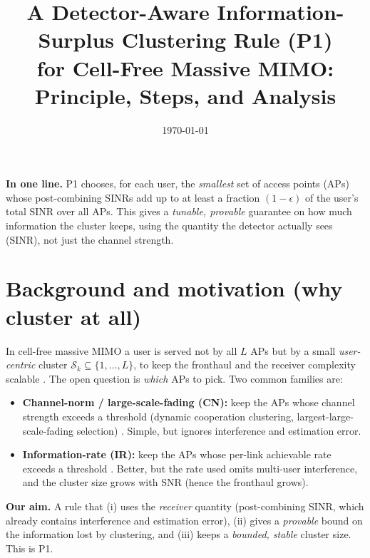 \documentclass[11pt]{article}
\title{\textbf{A Detector-Aware Information-Surplus Clustering Rule (P1)\\for Cell-Free Massive MIMO: Principle, Steps, and Analysis}}
\date{\today}
\newcommand{\Sk}{\mathcal{S}_k}\newcommand{\E}{\mathbb{E}}
\begin{document}
\maketitle
\newcommand{\vexp}[2]{\par\smallskip\noindent\textit{#2}}

\begin{keybox}
\textbf{In one line.} P1 chooses, for each user, the \emph{smallest} set of access points (APs)
whose post-combining SINRs add up to at least a fraction $(1-\epsilon)$ of the user's total SINR
over all APs. This gives a \emph{tunable, provable} guarantee on how much information the cluster
keeps, using the quantity the detector actually sees (SINR), not just the channel strength.
\end{keybox}

\section{Background and motivation (why cluster at all)}
In cell-free massive MIMO a user is served not by all $L$ APs but by a small \emph{user-centric}
cluster $\Sk\subseteq\{1,\dots,L\}$, to keep the fronthaul and the receiver complexity scalable
\cite{ngo2017cellfree,buzzi2017usercentric,interdonato2019ubiquitous,bjornson2020scalable}. The open
question is \emph{which} APs to pick. Two common families are:
\begin{itemize}[leftmargin=1.4em,itemsep=1pt]
\item \textbf{Channel-norm / large-scale-fading (CN):} keep the APs whose channel strength exceeds a
      threshold (dynamic cooperation clustering, largest-large-scale-fading selection)
      \cite{bjornson2020scalable,ngo2018totalenergy}. Simple, but ignores interference and
      estimation error.
\item \textbf{Information-rate (IR):} keep the APs whose per-link achievable rate exceeds a threshold
      \cite{mashdour2024clustering}. Better, but the rate used omits multi-user interference, and the
      cluster size grows with SNR (hence the fronthaul grows).
\end{itemize}
\textbf{Our aim.} A rule that (i) uses the \emph{receiver} quantity (post-combining SINR, which
already contains interference and estimation error), (ii) gives a \emph{provable} bound on the
information lost by clustering, and (iii) keeps a \emph{bounded, stable} cluster size. This is P1.
\end{document}
